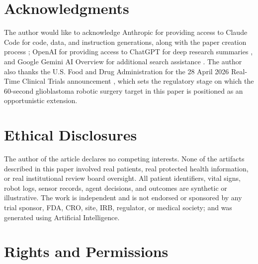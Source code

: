 


{}
\section*{Acknowledgments}
\label{sec:acknowledgments}
 

The author would like to acknowledge Anthropic for providing access to
Claude Code for code, data, and instruction generations, along with the
paper creation process \cite{claude-code, claude-opus-47,
claude-sonnet-46}; OpenAI for providing access to ChatGPT for deep
research summaries \cite{chatgpt-thinking}, and Google Gemini AI
Overview for additional search assistance \cite{google-gemini-overview}.
The author also thanks the U.S. Food and Drug Administration for the
28 April 2026 Real-Time Clinical Trials announcement
\cite{fda2026realtime}, which sets the regulatory stage on which the
60-second glioblastoma robotic surgery target in this paper is
positioned as an opportunistic extension.

{}
\section*{Ethical Disclosures}
\label{sec:ethics}

The author of the article declares no competing interests. None of
the artifacts described in this paper involved real patients, real
protected health information, or real institutional review board
oversight. All patient identifiers, vital signs, robot logs, sensor
records, agent decisions, and outcomes are synthetic or illustrative.
The work is independent and is not endorsed or sponsored by any trial
sponsor, FDA, CRO, site, IRB, regulator, or medical society; and was
generated using Artificial Intelligence.

{}
\section*{Rights and Permissions}
\label{sec:rights}

